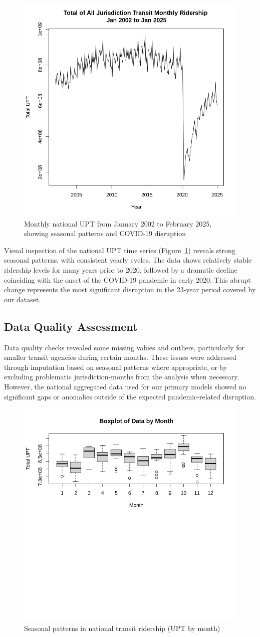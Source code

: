 \documentclass[11pt]{article}
\begin{document}
\begin{figure}[!ht]
\centering
\includegraphics[width=0.525\linewidth]{Total_UPT_trend.png}
\caption{Monthly national UPT from January 2002 to February 2025, showing seasonal patterns and COVID-19 disruption}
\label{f:data}
\end{figure}

Visual inspection of the national UPT time series (Figure~\ref{f:data}) reveals strong seasonal patterns, with consistent yearly cycles. The data shows relatively stable ridership levels for many years prior to 2020, followed by a dramatic decline coinciding with the onset of the COVID-19 pandemic in early 2020. This abrupt change represents the most significant disruption in the 23-year period covered by our dataset.

\subsection{Data Quality Assessment}

Data quality checks revealed some missing values and outliers, particularly for smaller transit agencies during certain months. These issues were addressed through imputation based on seasonal patterns where appropriate, or by excluding problematic jurisdiction-months from the analysis when necessary. However, the national aggregated data used for our primary models showed no significant gaps or anomalies outside of the expected pandemic-related disruption.

\begin{figure}[!ht]
\centering
\includegraphics[width=0.525\linewidth]{seasonal_trend.png}
\caption{Seasonal patterns in national transit ridership (UPT by month)}
\label{f:seasonal}
\end{figure}
\end{document}
